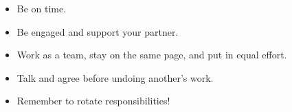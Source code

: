 \documentclass{tufte-handout}
\begin{document}
\begin{itemize}
\item Be on time.
\item Be engaged and support your partner.
\item Work as a team, stay on the same page, and put in equal effort.
\item Talk and agree before undoing another's work.
\item Remember to rotate responsibilities!
\end{itemize}





\end{document}
